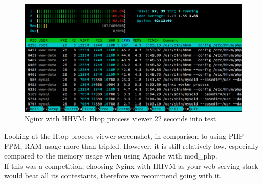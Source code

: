 \begin{figure}[H]
\begin{center}
\includegraphics[scale=0.5]{figures/Nginx_HHVM_24s.png}
\caption{Nginx with HHVM: Htop process viewer 22 seconds into test}
\label{fig:nginx_hhvm_24s}
\end{center}
\end{figure}

Looking at the Htop process viewer screenshot, in comparison to using PHP-FPM, RAM usage more than tripled. However, it is still relatively low, especially compared to the memory usage when using Apache with mod\_php. \\

If this was a competition, choosing Nginx with HHVM as your web-serving stack would beat all its contestants, therefore we recommend going with it.

